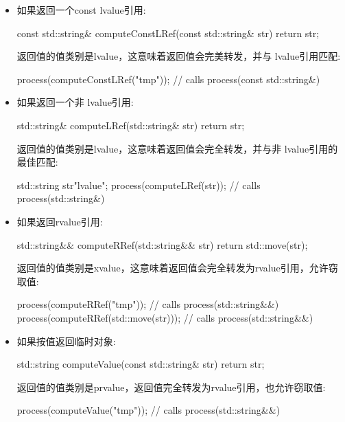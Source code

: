 \begin{itemize}
	\item 如果返回一个const lvalue引用:

\begin{cppcode}
const std::string& computeConstLRef(const std::string& str) {
	return str;
}
\end{cppcode}
返回值的值类别是lvalue，这意味着返回值会完美转发，并与 lvalue引用匹配:

\begin{cppcode}
process(computeConstLRef("tmp")); // calls process(const std::string&)
\end{cppcode}
\item 如果返回一个非 lvalue引用:

\begin{cppcode}
std::string& computeLRef(std::string& str) {
	return str;
}
\end{cppcode}
返回值的值类别是lvalue，这意味着返回值会完全转发，并与非 lvalue引用的最佳匹配:

\begin{cppcode}
std::string str{"lvalue"};
process(computeLRef(str)); // calls process(std::string&)
\end{cppcode}
\item 如果返回rvalue引用:

\begin{cppcode}
std::string&& computeRRef(std::string&& str) {
	return std::move(str);
}
\end{cppcode}
返回值的值类别是xvalue，这意味着返回值会完全转发为rvalue引用，允许窃取值:

\begin{cppcode}
process(computeRRef("tmp")); // calls process(std::string&&)
process(computeRRef(std::move(str))); // calls process(std::string&&)
\end{cppcode}
\item 如果按值返回临时对象:

\begin{cppcode}
std::string computeValue(const std::string& str) {
	return str;
}
\end{cppcode}
返回值的值类别是prvalue，返回值完全转发为rvalue引用，也允许窃取值:

\begin{cppcode}
process(computeValue("tmp")); // calls process(std::string&&)
\end{cppcode}
\end{itemize}

